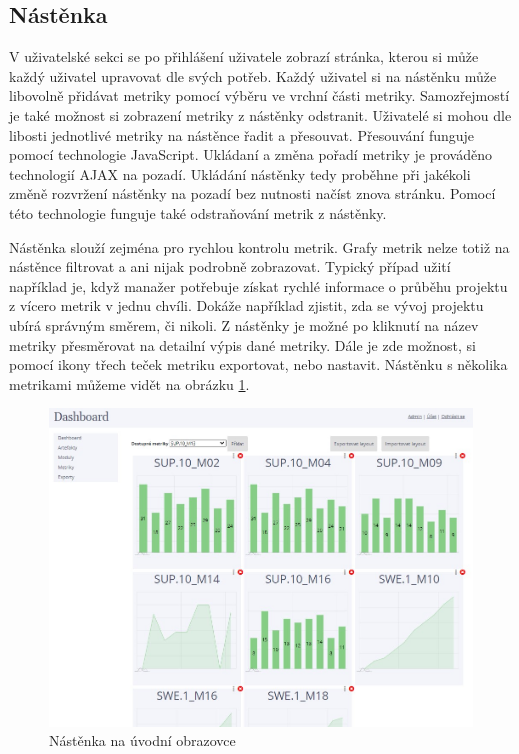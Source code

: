 \documentclass[czech,master,public,dept460,male,cpdeclaration,oneside]{diploma}
\begin{document}
\subsection{Nástěnka}
V uživatelské sekci se po přihlášení uživatele zobrazí stránka, kterou si může každý uživatel upravovat dle svých potřeb. Každý uživatel si na nástěnku může libovolně přidávat metriky pomocí výběru ve vrchní části metriky. Samozřejmostí je také možnost si zobrazení metriky z nástěnky odstranit. Uživatelé si mohou dle libosti jednotlivé metriky na nástěnce řadit a přesouvat. Přesouvání funguje pomocí technologie JavaScript. Ukládaní a změna pořadí metriky je prováděno technologií AJAX na pozadí. Ukládání nástěnky tedy proběhne při jakékoli změně rozvržení nástěnky na pozadí bez nutnosti načíst znova stránku. Pomocí této technologie funguje také odstraňování metrik z nástěnky. 

Nástěnka slouží zejména pro rychlou kontrolu metrik. Grafy metrik nelze totiž na nástěnce filtrovat a ani nijak podrobně zobrazovat. Typický případ užití například je, když manažer potřebuje získat rychlé informace o průběhu projektu z vícero metrik v jednu chvíli. Dokáže například zjistit, zda se vývoj projektu ubírá správným směrem, či nikoli. Z nástěnky je možné po kliknutí na název metriky přesměrovat na detailní výpis dané metriky. Dále je zde možnost, si pomocí ikony třech teček metriku exportovat, nebo nastavit. Nástěnku s několika metrikami můžeme vidět na obrázku \ref{fig:dashboard_metrics}.

\begin{figure}[!ht]
    \centering
    \includegraphics[width=1\textwidth]{Diplomka/Figures/dashboard_metrics.jpg}
    \caption{Nástěnka na úvodní obrazovce}
    \label{fig:dashboard_metrics}
\end{figure}
\end{document}
